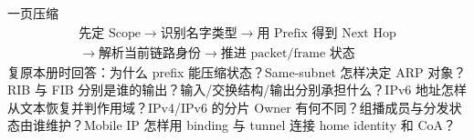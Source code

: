 \documentclass[11pt,a4paper]{ctexart}
\begin{document}
\begin{corebox}{一页压缩}
\[
\boxed{\begin{gathered}
\text{先定 Scope}\to\text{识别名字类型}\to\text{用 Prefix 得到 Next Hop}\\
\to\text{解析当前链路身份}\to\text{推进 packet/frame 状态}
\end{gathered}}
\]
复原本册时回答：为什么 prefix 能压缩状态？Same-subnet 怎样决定 ARP 对象？RIB 与 FIB 分别是谁的输出？输入/交换结构/输出分别承担什么？IPv6 地址怎样从文本恢复并判作用域？IPv4/IPv6 的分片 Owner 有何不同？组播成员与分发状态由谁维护？Mobile IP 怎样用 binding 与 tunnel 连接 home identity 和 CoA？
\end{corebox}
\end{document}
